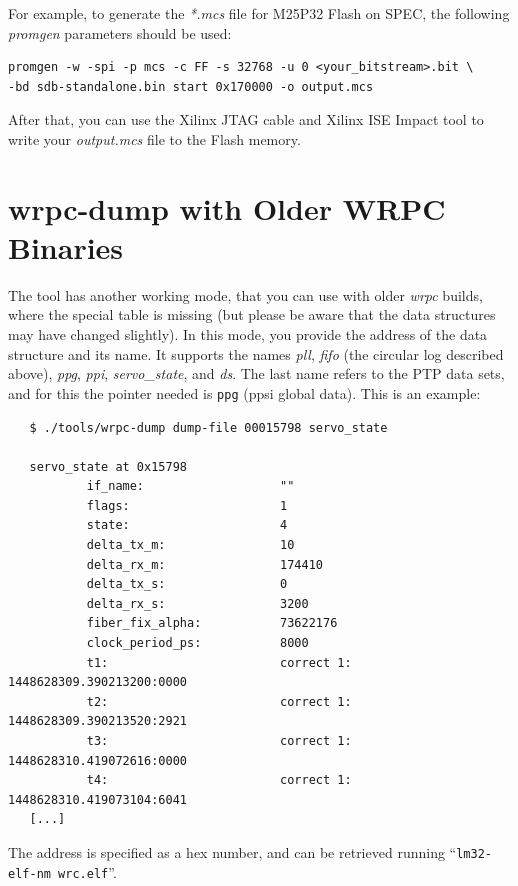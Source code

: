 \documentclass[a4paper, 12pt]{article}
\begin{document}
For example, to generate the \textit{*.mcs} file for M25P32 Flash on SPEC, the
following \textit{promgen} parameters should be used:
\begin{lstlisting}
promgen -w -spi -p mcs -c FF -s 32768 -u 0 <your_bitstream>.bit \
-bd sdb-standalone.bin start 0x170000 -o output.mcs
\end{lstlisting}

After that, you can use the Xilinx JTAG cable and Xilinx ISE Impact tool to
write your \textit{output.mcs} file to the Flash memory.
\newpage
\section{wrpc-dump with Older WRPC Binaries}
\label{wrpc-dump with Older WRPC Binaries}

The tool has another working mode, that you can use with older
\textit{wrpc} builds, where the special table is missing (but please be
aware that the data structures may have changed slightly).  In this
mode, you provide the address of the data structure and its name. It
supports the names \textit{pll}, \textit{fifo} (the circular log described
above), \textit{ppg}, \textit{ppi}, \textit{servo\_state}, and \textit{ds}. The last name
refers to the PTP data sets, and for this the pointer needed is
\texttt{ppg} (ppsi global data).
This is an example:

\begin{lstlisting}
   $ ./tools/wrpc-dump dump-file 00015798 servo_state

   servo_state at 0x15798
           if_name:                   ""
           flags:                     1
           state:                     4
           delta_tx_m:                10
           delta_rx_m:                174410
           delta_tx_s:                0
           delta_rx_s:                3200
           fiber_fix_alpha:           73622176
           clock_period_ps:           8000
           t1:                        correct 1: 1448628309.390213200:0000
           t2:                        correct 1: 1448628309.390213520:2921
           t3:                        correct 1: 1448628310.419072616:0000
           t4:                        correct 1: 1448628310.419073104:6041
   [...]
\end{lstlisting}

The address is specified as a hex number, and can be retrieved running
``\texttt{lm32-elf-nm  wrc.elf}''.
\end{document}
